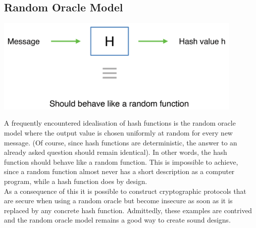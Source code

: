 	\subsection{Random Oracle Model}
		\begin{center}
			\includegraphics[width=120mm]{Graphics/Hash Functions/hf13.png}
		\end{center}
		A frequently encountered idealisation of hash functions is the random oracle model where the output value is chosen uniformly at random for every new message. 
		(Of course, since hash functions are deterministic, the answer to an already asked question should remain identical). 
		In other words, the hash function should behave like a random function. 
		This is impossible to achieve, since a random function almost never has a short description as a computer program, while a hash function does by design.\\
		As a consequence of this it is possible to construct cryptographic protocols that are secure when using a random oracle but become insecure as soon as it is replaced by any concrete hash function.
		Admittedly, these examples are contrived and the random oracle model remains a good way to create sound designs.
	
